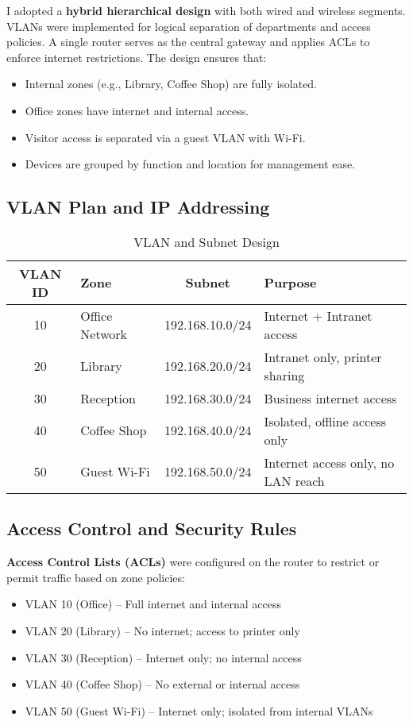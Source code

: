 \documentclass[11pt,a4paper]{article}
\begin{document}
I adopted a \textbf{hybrid hierarchical design} with both wired and wireless segments. VLANs were implemented for logical separation of departments and access policies. A single router serves as the central gateway and applies ACLs to enforce internet restrictions. The design ensures that:

\begin{itemize}
    \item Internal zones (e.g., Library, Coffee Shop) are fully isolated.
    \item Office zones have internet and internal access.
    \item Visitor access is separated via a guest VLAN with Wi-Fi.
    \item Devices are grouped by function and location for management ease.
\end{itemize}

\subsection{VLAN Plan and IP Addressing}

\begin{table}[h!]
\centering
\begin{tabular}{|c|l|c|l|}
\hline
\textbf{VLAN ID} & \textbf{Zone} & \textbf{Subnet} & \textbf{Purpose} \\
\hline
10 & Office Network & 192.168.10.0/24 & Internet + Intranet access \\
20 & Library & 192.168.20.0/24 & Intranet only, printer sharing \\
30 & Reception & 192.168.30.0/24 & Business internet access \\
40 & Coffee Shop & 192.168.40.0/24 & Isolated, offline access only \\
50 & Guest Wi-Fi & 192.168.50.0/24 & Internet access only, no LAN reach \\
\hline
\end{tabular}
\caption{VLAN and Subnet Design}
\end{table}

\subsection{Access Control and Security Rules}

\textbf{Access Control Lists (ACLs)} were configured on the router to restrict or permit traffic based on zone policies:
\begin{itemize}
    \item VLAN 10 (Office) – Full internet and internal access
    \item VLAN 20 (Library) – No internet; access to printer only
    \item VLAN 30 (Reception) – Internet only; no internal access
    \item VLAN 40 (Coffee Shop) – No external or internal access
    \item VLAN 50 (Guest Wi-Fi) – Internet only; isolated from internal VLANs
\end{itemize}
\end{document}
